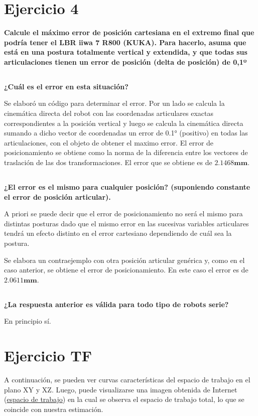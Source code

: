 \documentclass[a4paper,12pt]{article}
\begin{document}
\section{Ejercicio 4}
\textbf{Calcule el máximo error de posición cartesiana en el extremo final
que podría tener el LBR iiwa 7 R800 (KUKA). Para hacerlo, asuma que está en
una postura totalmente vertical y extendida, y que todas sus articulaciones
tienen un error de posición (delta de posición) de 0,1º}

\subsection{}
\textbf{¿Cuál es el error en esta situación?}

Se elaboró un código para determinar el error.
Por un lado se calcula la cinemática directa del robot con las coordenadas articulares exactas correspondientes
a la posición vertical y luego se calcula la cinemática directa sumando a dicho vector de coordenadas
un error de 0.1° (positivo) en todas las articulaciones, con el objeto de obtener el maximo error.
El error de posicionamiento se obtiene como la norma de la diferencia entre los vectores de traslación de las dos transformaciones.
El error que se obtiene es de $\mathbf{2.1468 mm}$.

\subsection{}
\textbf{¿El error es el mismo para cualquier posición? (suponiendo constante el error de
posición articular).}

A priori se puede decir que el error de posicionamiento no será el mismo para distintas posturas
dado que el mismo error en las sucesivas variables articulares tendrá un efecto
distinto en el error cartesiano dependiendo de cuál sea la postura.

Se elabora un contraejemplo con otra posición articular genérica y, como en el caso anterior, se obtiene el error de posicionamiento.
En este caso el error es de $\mathbf{2.0611 mm}$.

\subsection{}
\textbf{¿La respuesta anterior es válida para todo tipo de robots serie?}

En principio sí.

\section{Ejercicio TF}
A continuación, se pueden ver curvas características del espacio de trabajo en el plano XY y XZ.
Luego, puede visualizarse una imagen obtenida de Internet (\href{https://www.universal-robots.com/articles/ur/release-notes/release-note-software-version-512xx/}{espacio de trabajo}) en la cual se
observa el espacio de trabajo total, lo que se coincide con nuestra estimación.
\end{document}
